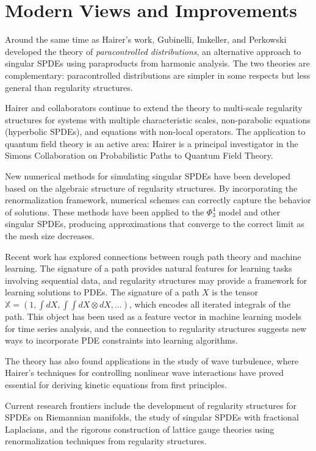 \section{Modern Views and Improvements}

Around the same time as Hairer's work, Gubinelli, Imkeller, and Perkowski developed the theory of \emph{paracontrolled distributions}, an alternative approach to singular SPDEs using paraproducts from harmonic analysis. The two theories are complementary: paracontrolled distributions are simpler in some respects but less general than regularity structures.

Hairer and collaborators continue to extend the theory to multi-scale regularity structures for systems with multiple characteristic scales, non-parabolic equations (hyperbolic SPDEs), and equations with non-local operators. The application to quantum field theory is an active area: Hairer is a principal investigator in the Simons Collaboration on Probabilistic Paths to Quantum Field Theory.

New numerical methods for simulating singular SPDEs have been developed based on the algebraic structure of regularity structures. By incorporating the renormalization framework, numerical schemes can correctly capture the behavior of solutions. These methods have been applied to the $\Phi^4_3$ model and other singular SPDEs, producing approximations that converge to the correct limit as the mesh size decreases.

Recent work has explored connections between rough path theory and machine learning. The signature of a path provides natural features for learning tasks involving sequential data, and regularity structures may provide a framework for learning solutions to PDEs. The signature of a path $X$ is the tensor $\mathbb{X} = (1, \int dX, \int\int dX\otimes dX, \ldots)$, which encodes all iterated integrals of the path. This object has been used as a feature vector in machine learning models for time series analysis, and the connection to regularity structures suggests new ways to incorporate PDE constraints into learning algorithms.

The theory has also found applications in the study of wave turbulence, where Hairer's techniques for controlling nonlinear wave interactions have proved essential for deriving kinetic equations from first principles.

Current research frontiers include the development of regularity structures for SPDEs on Riemannian manifolds, the study of singular SPDEs with fractional Laplacians, and the rigorous construction of lattice gauge theories using renormalization techniques from regularity structures.

